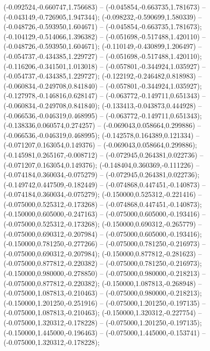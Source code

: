  (-0.092524,-0.660747,1.756683) -- (-0.045854,-0.663735,1.781673) -- (-0.043149,-0.726905,1.947344);
 (-0.098232,-0.590699,1.580339) -- (-0.048726,-0.593950,1.604671) -- (-0.045854,-0.663735,1.781673);
 (-0.104129,-0.514066,1.396382) -- (-0.051698,-0.517488,1.420110) -- (-0.048726,-0.593950,1.604671);
 (-0.110149,-0.430899,1.206497) -- (-0.054737,-0.434385,1.229727) -- (-0.051698,-0.517488,1.420110);
 (-0.116206,-0.341501,1.013018) -- (-0.057801,-0.344924,1.035927) -- (-0.054737,-0.434385,1.229727);
 (-0.122192,-0.246482,0.818983) -- (-0.060834,-0.249708,0.841840) -- (-0.057801,-0.344924,1.035927);
 (-0.127978,-0.146816,0.628147) -- (-0.063772,-0.149711,0.651343) -- (-0.060834,-0.249708,0.841840);
 (-0.133413,-0.043873,0.444928) -- (-0.066536,-0.046319,0.468995) -- (-0.063772,-0.149711,0.651343);
 (-0.138336,0.060574,0.274257) -- (-0.069043,0.058664,0.299886) -- (-0.066536,-0.046319,0.468995);
 (-0.142578,0.164389,0.121334) -- (-0.071207,0.163054,0.149376) -- (-0.069043,0.058664,0.299886);
 (-0.145981,0.265167,-0.008712) -- (-0.072945,0.264381,0.022736) -- (-0.071207,0.163054,0.149376);
 (-0.148404,0.360369,-0.111226) -- (-0.074184,0.360034,-0.075279) -- (-0.072945,0.264381,0.022736);
 (-0.149742,0.447509,-0.182449) -- (-0.074868,0.447451,-0.140873) -- (-0.074184,0.360034,-0.075279);
 (-0.150000,0.525312,-0.221416) -- (-0.075000,0.525312,-0.173268) -- (-0.074868,0.447451,-0.140873);
 (-0.150000,0.605000,-0.247163) -- (-0.075000,0.605000,-0.193416) -- (-0.075000,0.525312,-0.173268);
 (-0.150000,0.690312,-0.265779) -- (-0.075000,0.690312,-0.207984) -- (-0.075000,0.605000,-0.193416);
 (-0.150000,0.781250,-0.277266) -- (-0.075000,0.781250,-0.216973) -- (-0.075000,0.690312,-0.207984);
 (-0.150000,0.877812,-0.281623) -- (-0.075000,0.877812,-0.220382) -- (-0.075000,0.781250,-0.216973);
 (-0.150000,0.980000,-0.278850) -- (-0.075000,0.980000,-0.218213) -- (-0.075000,0.877812,-0.220382);
 (-0.150000,1.087813,-0.268948) -- (-0.075000,1.087813,-0.210463) -- (-0.075000,0.980000,-0.218213);
 (-0.150000,1.201250,-0.251916) -- (-0.075000,1.201250,-0.197135) -- (-0.075000,1.087813,-0.210463);
 (-0.150000,1.320312,-0.227754) -- (-0.075000,1.320312,-0.178228) -- (-0.075000,1.201250,-0.197135);
 (-0.150000,1.445000,-0.196463) -- (-0.075000,1.445000,-0.153741) -- (-0.075000,1.320312,-0.178228);
